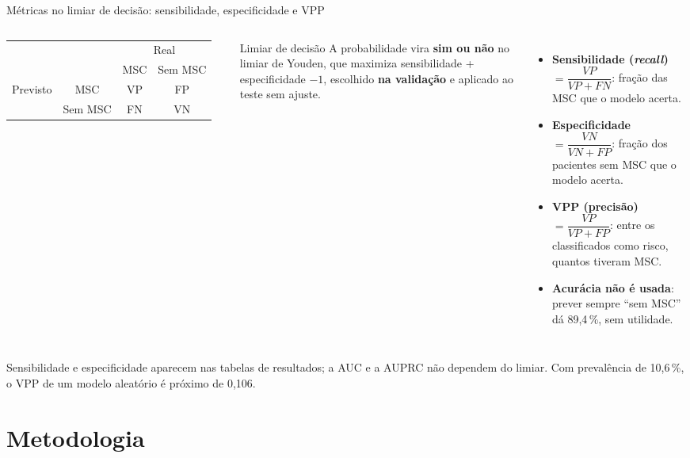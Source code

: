 \documentclass[10pt,aspectratio=169]{beamer}
\newcommand{\fonte}[1]{\par\vfill{\scriptsize\color{cinza}#1}}
\begin{document}
\begin{frame}{Métricas no limiar de decisão: sensibilidade, especificidade e VPP}
  \begin{columns}[T]
    \centering
    \footnotesize
    \begin{tabular}{cc|cc}
      \multicolumn{2}{c|}{} & \multicolumn{2}{c}{Real} \\
      & & MSC & Sem MSC \\
      \midrule
      \multirow{2}{*}{Previsto} & MSC & VP & FP \\
      & Sem MSC & FN & VN \\
    \end{tabular}
    \vspace{0.3cm}

    \small
    \begin{block}{Limiar de decisão}
      A probabilidade vira \textbf{sim ou não} no limiar de Youden, que maximiza
      sensibilidade + especificidade $-1$, escolhido \textbf{na validação} e
      aplicado ao teste sem ajuste.
    \end{block}
    \small
    \begin{itemize}
      \item \textbf{Sensibilidade (\textit{recall})} $=\dfrac{VP}{VP+FN}$: fração das MSC que o modelo acerta.
      \item \textbf{Especificidade} $=\dfrac{VN}{VN+FP}$: fração dos pacientes sem MSC que o modelo acerta.
      \item \textbf{VPP (precisão)} $=\dfrac{VP}{VP+FP}$: entre os classificados como risco, quantos tiveram MSC.
      \item \textbf{Acurácia não é usada}: prever sempre ``sem MSC'' dá 89,4\,\%, sem utilidade.
    \end{itemize}
  \end{columns}
  \fonte{Sensibilidade e especificidade aparecem nas tabelas de resultados; a AUC e a AUPRC não dependem do limiar. Com prevalência de 10,6\,\%, o VPP de um modelo aleatório é próximo de 0,106.}
\end{frame}

\section{Metodologia}
\end{document}
